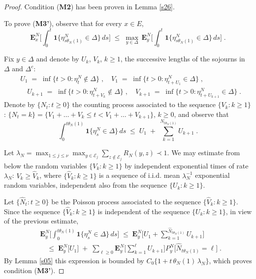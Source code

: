\documentclass[reqno]{amsart}
\begin{document}
\begin{proof}
Condition ({\bf M2}) has been proven in Lemma \ref{s26}.

To prove ({\bf M3'}), observe that for every $x\in E$,
\begin{equation*}
{{\mathbf E}}^N_x \Big[ \int_0^{t} {{\mathbf 1}}\{ \eta^N_{s\theta_N(1)} \in \Delta \} \, ds
\Big] \;\le\; \max_{y\in \Delta} \, {{\mathbf E}}^N_y \Big[ \int_0^{t} 
{{\mathbf 1}}\{ \eta^N_{s\theta_N(1)} \in \Delta \} \, ds \Big] \;.
\end{equation*}

Fix $y\in \Delta$ and denote by $U_k$, $V_k$, $k\ge 1$, the successive
lengths of the sojourns in $\Delta$ and $\Delta^c$:
\begin{equation*}
\begin{split}
& U_1 \;=\; \inf\{t>0 : \eta^N_t \not\in \Delta \}\;, \quad
V_1 \;=\; \inf\{t>0 : \eta^N_{t+U_1} \in \Delta \} \;, \\
& \quad
U_{k+1} \;=\; \inf\{t>0 : \eta^N_{t+V_k} \not\in \Delta\}  \;, \quad
V_{k+1} \;=\; \inf\{t>0 : \eta^N_{t+U_{k+1}} \in \Delta\}  \;.
\end{split}
\end{equation*}
Denote by $\{N_t : t\ge 0\}$ the counting process associated to the
sequence $\{V_k : k\ge 1\}$: $\{N_t = k\} = \{ V_1 + \dots + V_{k} \le
t < V_1 + \dots + V_{k+1}\}$, $k\ge 0$, and observe that 
\begin{equation*}
\int_0^{t \theta_N(1)} {{\mathbf 1}}\{ \eta^N_s \in \Delta \} \, ds \;\le\;
U_1 \;+\; \sum_{k=1}^{N_{t \theta_N(1)}} U_{k+1}\;. 
\end{equation*}

Let $\lambda_N = \max_{1\le j\le \nu} \max_{y\in {{\mathcal E}}_j} \sum_{z\not
  \in {{\mathcal E}}_j} R_N(y,z) \prec 1$.  We may estimate from below the
random variables $\{V_k :k\ge 1\}$ by independent exponential times of
rate $\lambda_N$: $V_k \ge \hat V_k$, where $\{\hat V_k : k\ge 1\}$ is
a sequence of i.i.d. mean $\lambda_N^{-1}$ exponential random
variables, independent also from the sequence $\{U_k :k\ge 1\}$.

Let $\{\hat N_t : t\ge 0\}$ be the Poisson process associated to the
sequence $\{\hat V_k : k\ge 1\}$. Since the sequence $\{\hat V_k :
k\ge 1\}$ is independent of the sequence $\{U_k :k\ge 1\}$, in view of
the previous estimate,
\begin{equation*}
\begin{split}
& {{\mathbf E}}^N_y \Big[ \int_0^{t\theta_N(1)} {{\mathbf 1}}\{ \eta^N_{s} \in \Delta \} \, 
ds \Big] \;\le\; 
{{\mathbf E}}^N_y \Big[U_1 + \sum_{k=1}^{\hat N_{t \theta_N(1)}} U_{k+1} \Big] \\
& \quad  \le\; {{\mathbf E}}^N_y \big[ U_1 \big] \;+\; \sum_{\ell \ge 0}
{{\mathbf E}}^N_y \Big[ \sum_{k=1}^{\ell} U_{k+1} \Big] 
P^N_y \Big[\hat N_{t \theta_N(1)} = \ell \big] \;.  
\end{split}
\end{equation*}
By Lemma \ref{s05} this expression is bounded by $C_0 \{ 1 + t\,
\theta_N(1) \, \lambda_N\}$, which proves condition ({\bf M3'}).


\end{proof}
\end{document}
